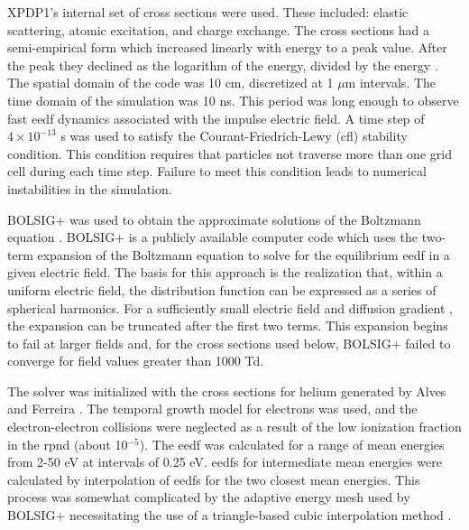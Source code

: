XPDP1's internal set of cross sections were used. These included: elastic
scattering, atomic excitation, and charge exchange. The cross sections had a
semi-empirical form which increased linearly with energy to a peak value. After
the peak they declined as the logarithm of the energy, divided by the energy
\cite{Verboncoeur1993}. The spatial domain of the code was 10 cm, discretized at
1 $\mu$m intervals. The time domain of the simulation was 10 ns. This period was
long enough to observe fast \acs{eedf} dynamics associated with the impulse
electric field. A time step of $4\times10^{-13}$ s was used to satisfy the
Courant-Friedrich-Lewy (\acs{cfl}) stability condition. This condition requires
that particles not traverse more than one grid cell during each time step.
Failure to meet this condition leads to numerical instabilities in the
simulation.

BOLSIG+ was used to obtain the approximate solutions of the Boltzmann equation
\cite{Hagelaar2005}. BOLSIG+ is a publicly available computer code which uses
the two-term expansion of the Boltzmann equation to solve for the equilibrium
\acs{eedf} in a given electric field. The basis for this approach is the
realization that, within a uniform electric field, the distribution function can
be expressed as a series of spherical harmonics. For a sufficiently small
electric field and diffusion gradient \cite{Holstein1946}, the expansion can be
truncated after the first two terms. This expansion begins to fail at larger
fields \cite{Allis1982} and, for the cross sections used below, BOLSIG+ failed
to converge for field values greater than 1000 Td.

The solver was initialized with the cross sections for helium generated by Alves
and Ferreira \cite{Alves2013}. The temporal growth model for electrons was used,
and the electron-electron collisions were neglected as a result of the low
ionization fraction in the \acs{rpnd} (about 10$^{-5}$). The \acs{eedf} was
calculated for a range of mean energies from 2-50 eV at intervals of
0.25 eV. \acs{eedf}s for intermediate mean energies were calculated by
interpolation of \acs{eedf}s for the two closest mean energies. This process was
somewhat complicated by the adaptive energy mesh used by BOLSIG+ necessitating
the use of a triangle-based cubic interpolation method \cite{Jones2001}.

